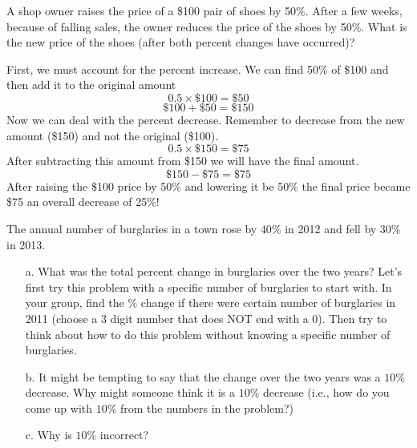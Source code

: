 \documentclass{ximera}
\begin{document}
\begin{example}
A shop owner raises the price of a \$100 pair of shoes by 50\%. After a few weeks, because of falling sales, the owner reduces the price of the shoes by 50\%.
What is the new price of the shoes (after both percent changes have occurred)?
\begin{explanation}
  First, we must account for the percent increase. We can find 50\% of \$100 and then add it to the original amount
\[
0.5 \times \$100 = \$50
\]
\[
\$ 100 + \$50 = \$ 150
\]
Now we can deal with the percent decrease. Remember to decrease from the new amount (\$150) and not the original (\$100).
\[
0.5 \times \$150 = \$75
\]
After subtracting this amount from \$150 we will have the final amount.
\[
\$ 150 - \$75 = \$ 75
\]
After raising the \$100 price by 50\% and lowering it be 50\% the final price became \$75 an overall decrease of 25\%!
\end{explanation}
\end{example}



\begin{exploration}
The annual number of burglaries in a town rose by $40\%$ in 2012 and fell by $30\%$ in 2013.
\begin{itemize}
\item[a.] What was the total percent change in burglaries over the two years?
Let's first try this problem with a specific number of burglaries to start with.  In your group, find the $\%$ change if there were certain number of burglaries in 2011 (choose a 3 digit number that does NOT end with a 0).  Then try to think about how to do this problem without knowing a specific number of burglaries.
\item[b.] It might be tempting to say that the change over the two years was a $10\%$ decrease.  Why might someone think it is a $10\%$ decrease (i.e., how do you come up with $10\%$ from the numbers in the problem?)
\item[c.] Why is $10\%$ incorrect?
\end{itemize}
\end{exploration}
\end{document}
